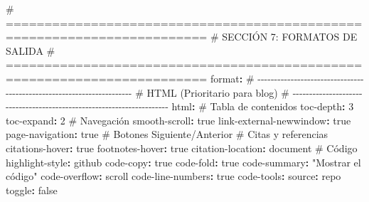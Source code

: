 \documentclass[
  doc,
  floatsintext,
  longtable,
  a4paper,
  nolmodern,
  notxfonts,
  notimes,
  12pt,
  colorlinks=true,linkcolor=blue,citecolor=blue,urlcolor=blue]{apa7}
\newenvironment{Shaded}{\begin{snugshade}}{\end{snugshade}}
\newcommand{\AttributeTok}[1]{\textcolor[rgb]{0.40,0.45,0.13}{#1}}
\newcommand{\CharTok}[1]{\textcolor[rgb]{0.13,0.47,0.30}{#1}}
\newcommand{\CommentTok}[1]{\textcolor[rgb]{0.37,0.37,0.37}{#1}}
\newcommand{\DecValTok}[1]{\textcolor[rgb]{0.68,0.00,0.00}{#1}}
\newcommand{\FunctionTok}[1]{\textcolor[rgb]{0.28,0.35,0.67}{#1}}
\newcommand{\KeywordTok}[1]{\textcolor[rgb]{0.00,0.23,0.31}{\textbf{#1}}}
\newcommand{\StringTok}[1]{\textcolor[rgb]{0.13,0.47,0.30}{#1}}
\begin{document}
\begin{Shaded}
\begin{Highlighting}[]
\CommentTok{\# ========================================================================}
\CommentTok{\# SECCIÓN 7: FORMATOS DE SALIDA}
\CommentTok{\# ========================================================================}
\FunctionTok{format}\KeywordTok{:}
\CommentTok{  \# {-}{-}{-}{-}{-}{-}{-}{-}{-}{-}{-}{-}{-}{-}{-}{-}{-}{-}{-}{-}{-}{-}{-}{-}{-}{-}{-}{-}{-}{-}{-}{-}{-}{-}{-}{-}{-}{-}{-}{-}{-}{-}{-}{-}{-}{-}{-}{-}{-}{-}{-}{-}{-}{-}{-}{-}{-}{-}{-}{-}{-}{-}{-}{-}{-}{-}{-}{-}{-}{-}}
\CommentTok{  \# HTML (Prioritario para blog)}
\CommentTok{  \# {-}{-}{-}{-}{-}{-}{-}{-}{-}{-}{-}{-}{-}{-}{-}{-}{-}{-}{-}{-}{-}{-}{-}{-}{-}{-}{-}{-}{-}{-}{-}{-}{-}{-}{-}{-}{-}{-}{-}{-}{-}{-}{-}{-}{-}{-}{-}{-}{-}{-}{-}{-}{-}{-}{-}{-}{-}{-}{-}{-}{-}{-}{-}{-}{-}{-}{-}{-}{-}{-}}
\AttributeTok{  }\FunctionTok{html}\KeywordTok{:}
\CommentTok{    \# Tabla de contenidos}
\AttributeTok{    }\FunctionTok{toc{-}depth}\KeywordTok{:}\AttributeTok{ }\DecValTok{3}
\AttributeTok{    }\FunctionTok{toc{-}expand}\KeywordTok{:}\AttributeTok{ }\DecValTok{2}
\AttributeTok{    }
\CommentTok{    \# Navegación}
\AttributeTok{    }\FunctionTok{smooth{-}scroll}\KeywordTok{:}\AttributeTok{ }\CharTok{true}
\AttributeTok{    }\FunctionTok{link{-}external{-}newwindow}\KeywordTok{:}\AttributeTok{ }\CharTok{true}
\AttributeTok{    }\FunctionTok{page{-}navigation}\KeywordTok{:}\AttributeTok{ }\CharTok{true}\CommentTok{                 \# Botones Siguiente/Anterior}
\AttributeTok{    }
\CommentTok{    \# Citas y referencias}
\AttributeTok{    }\FunctionTok{citations{-}hover}\KeywordTok{:}\AttributeTok{ }\CharTok{true}
\AttributeTok{    }\FunctionTok{footnotes{-}hover}\KeywordTok{:}\AttributeTok{ }\CharTok{true}
\AttributeTok{    }\FunctionTok{citation{-}location}\KeywordTok{:}\AttributeTok{ document}
\AttributeTok{    }
\CommentTok{    \# Código}
\AttributeTok{    }\FunctionTok{highlight{-}style}\KeywordTok{:}\AttributeTok{ github}
\AttributeTok{    }\FunctionTok{code{-}copy}\KeywordTok{:}\AttributeTok{ }\CharTok{true}
\AttributeTok{    }\FunctionTok{code{-}fold}\KeywordTok{:}\AttributeTok{ }\CharTok{true}
\AttributeTok{    }\FunctionTok{code{-}summary}\KeywordTok{:}\AttributeTok{ }\StringTok{"Mostrar el código"}
\AttributeTok{    }\FunctionTok{code{-}overflow}\KeywordTok{:}\AttributeTok{ scroll}
\AttributeTok{    }\FunctionTok{code{-}line{-}numbers}\KeywordTok{:}\AttributeTok{ }\CharTok{true}
\AttributeTok{    }\FunctionTok{code{-}tools}\KeywordTok{:}
\AttributeTok{      }\FunctionTok{source}\KeywordTok{:}\AttributeTok{ repo}
\AttributeTok{      }\FunctionTok{toggle}\KeywordTok{:}\AttributeTok{ }\CharTok{false}

\end{Highlighting}
\end{Shaded}
\end{document}
